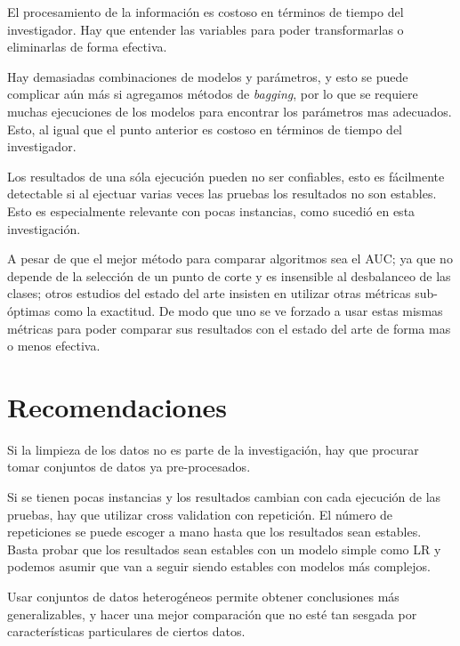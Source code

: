 El procesamiento de la información es costoso en términos de tiempo del investigador. Hay que entender las variables para poder transformarlas o eliminarlas de forma efectiva.

Hay demasiadas combinaciones de modelos y parámetros, y esto se puede complicar aún más si agregamos métodos de \textit{bagging}, por lo que se requiere muchas ejecuciones de los modelos para encontrar los parámetros mas adecuados. Esto, al igual que el punto anterior es costoso en términos de tiempo del investigador.

Los resultados de una sóla ejecución pueden no ser confiables, esto es fácilmente detectable si al ejectuar varias veces las pruebas los resultados no son estables. Esto es especialmente relevante con pocas instancias, como sucedió en esta investigación.

A pesar de que el mejor método para comparar algoritmos sea el AUC; ya que no depende de la selección de un punto de corte y es insensible al desbalanceo de las clases; otros estudios del estado del arte insisten en utilizar otras métricas sub-óptimas como la exactitud. De modo que uno se ve forzado a usar estas mismas métricas para poder comparar sus resultados con el estado del arte de forma mas o menos efectiva.


\section{Recomendaciones}

Si la limpieza de los datos no es parte de la investigación, hay que procurar tomar conjuntos de datos ya pre-procesados.

Si se tienen pocas instancias y los resultados cambian con cada ejecución de las pruebas, hay que utilizar cross validation con repetición. El número de repeticiones se puede escoger a mano hasta que los resultados sean estables. Basta probar que los resultados sean estables con un modelo simple como \ac{LR} y podemos asumir que van a seguir siendo estables con modelos más complejos.

Usar conjuntos de datos heterogéneos permite obtener conclusiones más generalizables, y hacer una mejor comparación que no esté tan sesgada por características particulares de ciertos datos.

